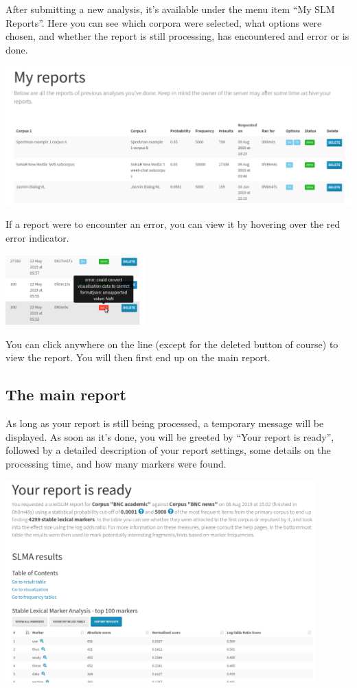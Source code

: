 \documentclass[11pt,a4paper]{article}
\begin{document}
After submitting a new analysis, it's available under the menu item ``My SLM Reports''. Here you can see which corpora were selected, what options were chosen, and whether the report is still processing, has encountered and error or is done.

\centerline{\includegraphics[width=\textwidth]{images/myreports.png}}

If a report were to encounter an error, you can view it by hovering over the red error indicator.

\centerline{\includegraphics[width=0.4\textwidth]{images/reporterror.png}}

You can click anywhere on the line (except for the deleted button of course) to view the report. You will then first end up on the main report.

\subsection{The main report}

As long as your report is still being processed, a temporary message will be displayed. As soon as it's done, you will be greeted by ``Your report is ready'', followed by a detailed description of your report settings, some details on the processing time, and how many markers were found. 

\centerline{\includegraphics[width=0.9\textwidth]{images/mainreport.png}}
\end{document}
